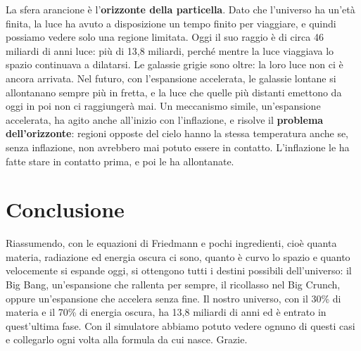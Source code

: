 \documentclass[12pt,a4paper]{article}
\begin{document}
La sfera arancione è l'\textbf{orizzonte della particella}. Dato che l'universo ha un'età finita, la luce ha avuto a disposizione un tempo finito per viaggiare, e quindi possiamo vedere solo una regione limitata. Oggi il suo raggio è di circa 46 miliardi di anni luce: più di 13,8 miliardi, perché mentre la luce viaggiava lo spazio continuava a dilatarsi. Le galassie grigie sono oltre: la loro luce non ci è ancora arrivata. Nel futuro, con l'espansione accelerata, le galassie lontane si allontanano sempre più in fretta, e la luce che quelle più distanti emettono da oggi in poi non ci raggiungerà mai. Un meccanismo simile, un'espansione accelerata, ha agito anche all'inizio con l'inflazione, e risolve il \textbf{problema dell'orizzonte}: regioni opposte del cielo hanno la stessa temperatura anche se, senza inflazione, non avrebbero mai potuto essere in contatto. L'inflazione le ha fatte stare in contatto prima, e poi le ha allontanate.

\section{Conclusione}
Riassumendo, con le equazioni di Friedmann e pochi ingredienti, cioè quanta materia, radiazione ed energia oscura ci sono, quanto è curvo lo spazio e quanto velocemente si espande oggi, si ottengono tutti i destini possibili dell'universo: il Big Bang, un'espansione che rallenta per sempre, il ricollasso nel Big Crunch, oppure un'espansione che accelera senza fine. Il nostro universo, con il 30\% di materia e il 70\% di energia oscura, ha 13,8 miliardi di anni ed è entrato in quest'ultima fase. Con il simulatore abbiamo potuto vedere ognuno di questi casi e collegarlo ogni volta alla formula da cui nasce. Grazie.
\end{document}
